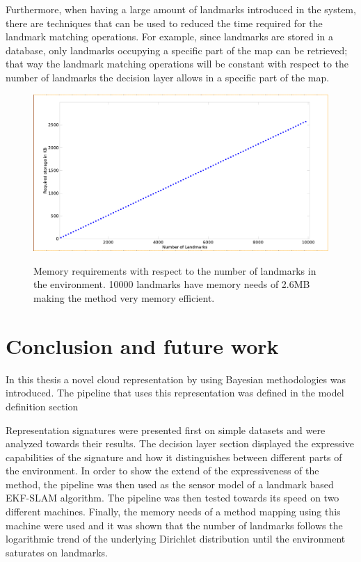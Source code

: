 \documentclass[twoside,hidelinks]{article}
\begin{document}
Furthermore, when having a large amount of landmarks introduced in the system, there are techniques that can be used to reduced the time required for the landmark matching operations.
For example, since landmarks are stored in a database, only landmarks occupying a specific part of the map can be retrieved;
that way the landmark matching operations will be constant with respect to the number of landmarks the decision layer allows in a specific part of the map. 

\begin{figure}[!ht]
  \centering
  \includegraphics[width=.8\textwidth]{MemoryRequirements} \\
  \caption{Memory requirements with respect to the number of landmarks in the environment. 10000 landmarks have memory needs of 2.6MB making the method very memory efficient.}
  \label{pip:reqs}
\end{figure}


\newpage
\section{Conclusion and future work}
\label{sec:conclusion}

 In this thesis a novel cloud representation by using Bayesian methodologies was introduced.
The pipeline that uses this representation was defined in the model definition section

Representation signatures were presented first on simple datasets and were analyzed towards their results. 
The decision layer section displayed the expressive capabilities of the signature and how it distinguishes between different parts of the environment.
In order to show the extend of the expressiveness of the method, the pipeline was then used as the sensor model of a landmark based EKF-SLAM algorithm.
The pipeline was then tested towards its speed on two different machines.
Finally, the memory needs of a method mapping using this machine were used and it was shown that the number of landmarks follows the logarithmic trend of the underlying Dirichlet distribution until the environment saturates on landmarks.
\end{document}
